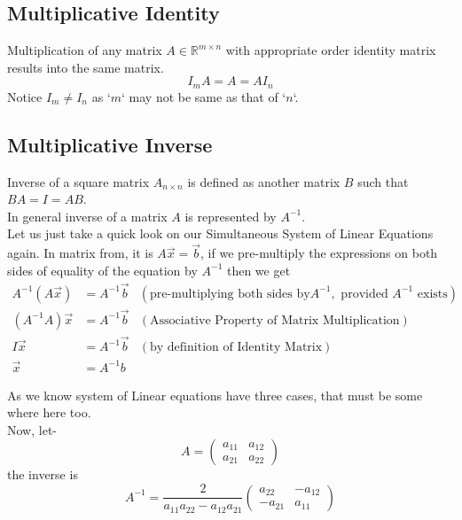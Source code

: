 \documentclass{article}
\begin{document}
\subsection{Multiplicative Identity}
Multiplication of any matrix \(A \in \mathbb{R} ^{m\times n}\) with appropriate order identity matrix results into the same matrix.
\[ I_m  A = A = A  I_n\]
Notice \(I_m \neq I_n\) as `\(m\)` may not be same as that of `\(n\)`.\\

\subsection{Multiplicative Inverse}
Inverse of a square matrix \(A_{n \times n}\) is defined as another matrix \(B\) such that \(BA = I = AB\).\\
In general inverse of a matrix \(A\) is represented by \(A ^{-1}\).\\

Let us just take a quick look on our Simultaneous System of Linear Equations again. In matrix from, it is \(A\vec{x} = \vec{b}\), if we pre-multiply the expressions on both sides of equality of the equation by \(A ^{-1}\) then we get
\begin{align}
    A^{-1}(A\vec{x}) &= A^{-1}\vec{b} &(\text{pre-multiplying both sides by} A^{-1}, \text{ provided } A^{-1} \text{ exists})\nonumber \\
    (A^{-1}A)\vec{x} &= A^{-1}\vec{b} &(\text{Associative Property of Matrix Multiplication})\nonumber \\
    I\vec{x} &= A^{-1}\vec{b} &(\text{by definition of Identity Matrix}) \nonumber \\
    \vec{x} &= A^{-1}b \nonumber
\end{align}

As we know system of Linear equations have three cases, that must be some where here too.\\
Now, let-\\
\[ A = \begin{pmatrix}
            a_{11} & a_{12}\\
            a_{21} & a_{22}
        \end{pmatrix}\]
        the inverse is \[A^{-1} = \frac{2}{a_{11}a_{22} - a_{12}a_{21}} \begin{pmatrix}
                                                                                            a_{22} & -a_{12}\\
                                                                                            -a_{21} & a_{11}
                                                                                       \end{pmatrix}\]\\
\end{document}
